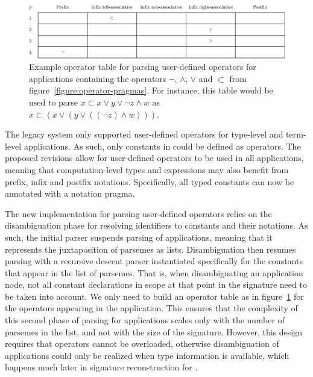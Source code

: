 \begin{figure}
\includegraphics[width=\textwidth]{figures/operator-table.eps}
\caption[Example operator table for parsing user-defined operators.]{%
Example operator table for parsing user-defined operators for applications containing the operators $\lnot$, $\land$, $\lor$ and $\subset$ from figure~\ref{figure:operator-pragmas}.
For instance, this table would be used to parse $x \subset x \lor y \lor \lnot z \land w$ as $x \subset (x \lor (y \lor ((\lnot z) \land w)))$.
}
\label{figure:operator-table}
\end{figure}

The legacy \Beluga system only supported user-defined operators for \LF type-level and term-level applications.
As such, only constants in \LF could be defined as operators.
The proposed revisions allow for user-defined operators to be used in all applications, meaning that computation-level types and expressions may also benefit from prefix, infix and postfix notations.
Specifically, all typed constants can now be annotated with a notation pragma.

The new implementation for parsing user-defined operators relies on the disambiguation phase for resolving identifiers to constants and their notations.
As such, the initial parser suspends parsing of applications, meaning that it represents the juxtaposition of parsemes as lists.
Disambiguation then resumes parsing with a recursive descent parser instantiated specifically for the constants that appear in the list of parsemes.
That is, when disambiguating an application node, not all constant declarations in scope at that point in the \Beluga signature need to be taken into account.
We only need to build an operator table as in figure~\ref{figure:operator-table} for the operators appearing in the application.
This ensures that the complexity of this second phase of parsing for applications scales only with the number of parsemes in the list, and not with the size of the signature.
However, this design requires that operators cannot be overloaded, otherwise disambiguation of applications could only be realized when type information is available, which happens much later in signature reconstruction for \Beluga.

